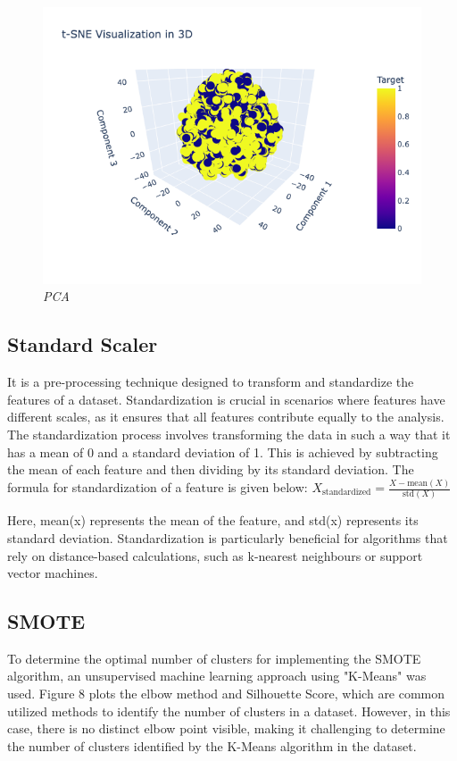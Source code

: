 \documentclass[10pt]{article}
\begin{document}
\begin{multicols}{2}
\begin{figure}[H]
    \centering
    \includegraphics[width=1\linewidth]{figure8.png}
    \caption{\justifying \textit{PCA}}
    \label{fig:PID Fuzzy}
\end{figure}


\subsection{Standard Scaler}
It is a pre-processing technique designed to transform and standardize the features of a dataset. Standardization is crucial in scenarios where features have different scales, as it ensures that all features contribute equally to the analysis.
The standardization process involves transforming the data in such a way that it has a mean of 0 and a standard deviation of 1. This is achieved by subtracting the mean of each feature and then dividing by its standard deviation. The formula for standardization of a feature is given below:
\newline
\newline
$X_{\text{standardized}} = \frac{X - \text{mean}(X)}{\text{std}(X)} $

Here, mean(x) represents the mean of the feature, and std(x) represents its standard deviation. Standardization is particularly beneficial for algorithms that rely on distance-based calculations, such as k-nearest neighbours or support vector machines.


\subsection{SMOTE}
To determine the optimal number of clusters for implementing the SMOTE algorithm, an unsupervised machine learning approach using "K-Means" was used. Figure 8 plots the elbow method and Silhouette Score, which are common utilized methods to identify the number of clusters in a dataset. However, in this case, there is no distinct elbow point visible, making it challenging to determine the number of clusters identified by the K-Means algorithm in the dataset.


\end{multicols}
\end{document}
